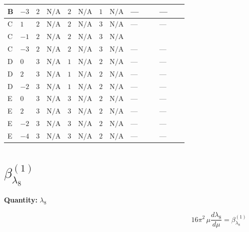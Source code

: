 \documentclass[8pt]{article}
\begin{document}
\begin{landscape}
\begin{longtable}{@{}llcccccc >{\raggedright\arraybackslash}p{0.21\linewidth} >{\raggedright\arraybackslash}p{0.21\linewidth}@{}}
\midrule
B & $-3$ & $2$ & $\text{N/A}$ & $2$ & $\text{N/A}$ & $1$ & $\text{N/A}$ & --- & --- \\
\midrule
C & $1$ & $2$ & $\text{N/A}$ & $2$ & $\text{N/A}$ & $3$ & $\text{N/A}$ & --- & --- \\
\midrule
C & $-1$ & $2$ & $\text{N/A}$ & $2$ & $\text{N/A}$ & $3$ & $\text{N/A}$ & \scriptsize\adjustbox{max width=\linewidth}{$\begin{gathered} +{\lambda_{HS_2}^{(1)}} (4 {\lambda_{H H^\dagger S_1^\dagger S_2^\dagger}^{\rm Cross}}+6 {\lambda_{10}})\end{gathered}$} & \scriptsize\adjustbox{max width=\linewidth}{$\begin{gathered} +{\lambda_{HS_2}^{(A)}} \left(-2 {\lambda_{H H^\dagger S_1^\dagger S_2^\dagger}^{\rm Cross}}-\frac{{\lambda_{10}}}{2}-{\lambda_{X_{17}}^{(1)}}\right)\end{gathered}$} \\
\midrule
C & $-3$ & $2$ & $\text{N/A}$ & $2$ & $\text{N/A}$ & $3$ & $\text{N/A}$ & --- & --- \\
\midrule
D & $0$ & $3$ & $\text{N/A}$ & $1$ & $\text{N/A}$ & $2$ & $\text{N/A}$ & --- & --- \\
\midrule
D & $2$ & $3$ & $\text{N/A}$ & $1$ & $\text{N/A}$ & $2$ & $\text{N/A}$ & --- & --- \\
\midrule
D & $-2$ & $3$ & $\text{N/A}$ & $1$ & $\text{N/A}$ & $2$ & $\text{N/A}$ & --- & --- \\
\midrule
E & $0$ & $3$ & $\text{N/A}$ & $3$ & $\text{N/A}$ & $2$ & $\text{N/A}$ & --- & --- \\
\midrule
E & $2$ & $3$ & $\text{N/A}$ & $3$ & $\text{N/A}$ & $2$ & $\text{N/A}$ & --- & --- \\
\midrule
E & $-2$ & $3$ & $\text{N/A}$ & $3$ & $\text{N/A}$ & $2$ & $\text{N/A}$ & --- & --- \\
\midrule
E & $-4$ & $3$ & $\text{N/A}$ & $3$ & $\text{N/A}$ & $2$ & $\text{N/A}$ & --- & --- \\
\midrule
\bottomrule
\end{longtable}
\clearpage
\section*{$\beta_{\lambda_{8}}^{(1)}$}
\noindent\textbf{Quantity: }$\lambda_{8}$\par\smallskip
\[16\pi^2\,\mu\frac{d \lambda_{8}}{d\mu}=\beta_{\lambda_{8}}^{(1)}\]

\end{landscape}
\end{document}
